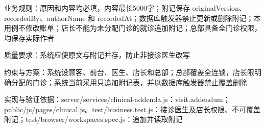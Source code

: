 \documentclass[UTF8,12pt,a4paper,fontset=none]{ctexart}
\begin{document}
业务规则：原因和内容均必填，内容最长5000字；附记保存 originalVersion、recordedBy、authorName 和 recordedAt；数据库触发器禁止更新或删除附记；本用例不修改账单；店长不能为未分配门诊的就诊追加附记；总部具备全门诊权限，均保存实际作者\par
质量要求：系统应使原文与附记并存，防止非接诊医生改写\par
约束与方案：系统设顾客、前台、医生、店长和总部；总部覆盖全连锁，店长限明确分配的门诊；系统当前采用只追加附记表，并以数据库触发器禁止覆盖删除\par
实现与验证依据：server/\allowbreak{}services/\allowbreak{}clinical-addenda.\allowbreak{}js：visit.\allowbreak{}addendum；public/\allowbreak{}js/\allowbreak{}pages/\allowbreak{}clinical.\allowbreak{}js。test/\allowbreak{}business.\allowbreak{}test.\allowbreak{}js：接诊医生及店长权限、不可覆盖附记；test/\allowbreak{}browser/\allowbreak{}workspaces.\allowbreak{}spec.\allowbreak{}js：追加并读取附记\par
{}
\end{document}
